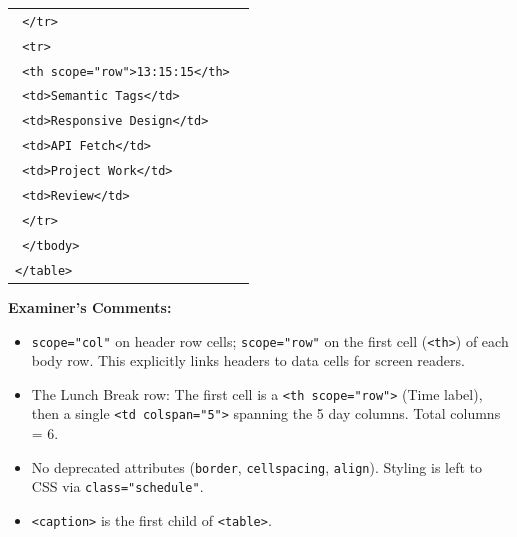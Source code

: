 \documentclass[11pt]{article}
\begin{document}
\begin{exoresolu}
\begin{center}
\begin{tabular}{|p{0.95\linewidth}|}
\texttt{    </tr>}\\
\texttt{    <tr>}\\
\texttt{      <th scope="row">13:15\textendash15:15</th>}\\
\texttt{      <td>Semantic Tags</td>}\\
\texttt{      <td>Responsive Design</td>}\\
\texttt{      <td>API Fetch</td>}\\
\texttt{      <td>Project Work</td>}\\
\texttt{      <td>Review</td>}\\
\texttt{    </tr>}\\
\texttt{  </tbody>}\\
\texttt{</table>}\\\hline
\end{tabular}
\end{center}

\textbf{Examiner's Comments:}
\begin{itemize}
    \item \texttt{scope="col"} on header row cells; \texttt{scope="row"} on the first cell (\texttt{<th>}) of each body row. This explicitly links headers to data cells for screen readers.
    \item The Lunch Break row: The first cell is a \texttt{<th scope="row">} (Time label), then a single \texttt{<td colspan="5">} spanning the 5 day columns. Total columns = 6.
    \item No deprecated attributes (\texttt{border}, \texttt{cellspacing}, \texttt{align}). Styling is left to CSS via \texttt{class="schedule"}.
    \item \texttt{<caption>} is the first child of \texttt{<table>}.
\end{itemize}
\end{exoresolu}
\end{document}
